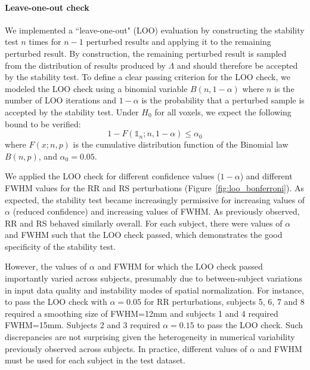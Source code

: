 \documentclass[lettersize,journal]{IEEEtran}
\begin{document}
\paragraph{Leave-one-out check} We implemented a ``leave-one-out" (LOO) evaluation by constructing the stability test $n$ times for $n-1$ perturbed results and applying it to the remaining perturbed result. By construction, the remaining perturbed result is sampled from the distribution of results produced by $\Lambda$ and should therefore be accepted by the stability test.
To define a clear passing criterion for the LOO check, we modeled the LOO check using a binomial variable $B(n,1-\alpha)$ where $n$ is the number of LOO iterations and $1-\alpha$ is the probability that a perturbed sample is accepted by the stability test. Under $H_0$ for all voxels, we expect the following bound to be verified:
\[
  1-F(\mathds{1}_n;n,1-\alpha) \leq \alpha_0
\]
where $F(x;n,p)$ is the cumulative distribution function of the Binomial law $B(n,p)$, and $\alpha_0=0.05$.

We applied the LOO check for different confidence values ($1-\alpha$) and different FWHM  values for the RR and RS perturbations (Figure~\ref{fig:loo_bonferroni}). As expected, the stability test became increasingly permissive for increasing values of $\alpha$ (reduced confidence) and increasing values of FWHM. As previously observed, RR and RS behaved similarly overall. For each subject, there were values of $\alpha$ and FWHM such that the LOO check passed, which demonstrates the good specificity of the stability test.

However, the values of $\alpha$ and FWHM for which the LOO check passed importantly varied across subjects, presumably due to between-subject variations in input data quality and instability modes of spatial normalization. For instance, to pass the LOO check with $\alpha=0.05$ for RR perturbations, subjects 5, 6, 7 and 8 required a smoothing size of FWHM=12mm and subjects 1 and 4 required FWHM=15mm. Subjects 2 and 3 required $\alpha=0.15$ to pass the LOO check. Such discrepancies are not surprising given the heterogeneity in numerical variability previously observed across subjects. In practice, different values of $\alpha$ and FWHM must be used for each subject in the test dataset.
\end{document}
